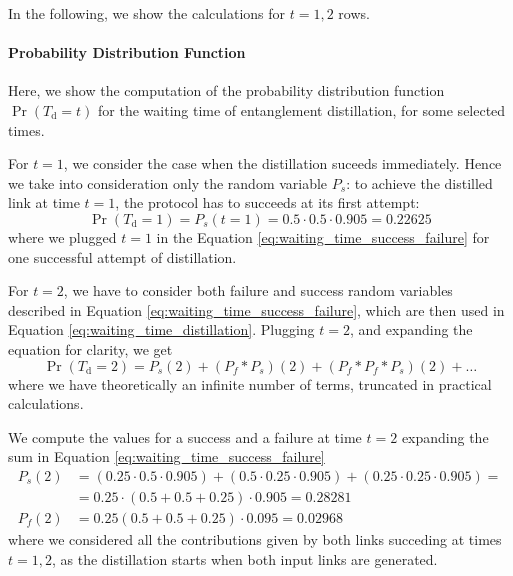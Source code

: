 \documentclass{masterthesis}
\begin{document}
In the following, we show the calculations for $t={1,2}$ rows.

\paragraph*{Probability Distribution Function}

Here, we show the computation of the probability distribution function $\Pr(T_{\text{d}} = t)$ for the waiting time of entanglement distillation, for some selected times.

For $t = 1$, we consider the case when the distillation suceeds immediately. Hence we take into consideration only the random variable $P_s$: to achieve the distilled link at time $t=1$, the protocol has to succeeds at its first attempt: 
\begin{equation}
    \Pr(T_{\text{d}} = 1) = P_s(t = 1) = 0.5 \cdot 0.5 \cdot 0.905 = 0.22625
\end{equation}
where we plugged $t = 1$ in the Equation \ref{eq:waiting_time_success_failure} for one successful attempt of distillation.

For $t = 2$, we have to consider both failure and success random variables described in Equation \ref{eq:waiting_time_success_failure}, which are then used in Equation \ref{eq:waiting_time_distillation}. Plugging $t=2$, and expanding the equation for clarity, we get 
\begin{equation}\label{eq:distillation_t2}
    \Pr(T_{\text{d}} = 2) = P_s(2) + (P_f \ast P_s)(2) + (P_f \ast P_f \ast P_s)(2) + \ldots
\end{equation}
where we have theoretically an infinite number of terms, truncated in practical calculations.

We compute the values for a success and a failure at time $t=2$ expanding the sum in Equation \ref{eq:waiting_time_success_failure}
\begin{align}
    P_s(2) &= \left(0.25 \cdot 0.5 \cdot 0.905\right) + \left(0.5 \cdot 0.25 \cdot 0.905\right) + \left(0.25 \cdot 0.25 \cdot 0.905\right) = \\
           &= 0.25 \cdot \left(0.5 + 0.5 + 0.25 \right) \cdot 0.905 = 0.28281 \\
    P_f(2) &= 0.25 \left(0.5 + 0.5 + 0.25\right) \cdot 0.095 = 0.02968
\end{align}
where we considered all the contributions given by both links succeding at times $t={1,2}$, as the distillation starts when both input links are generated.
\end{document}
